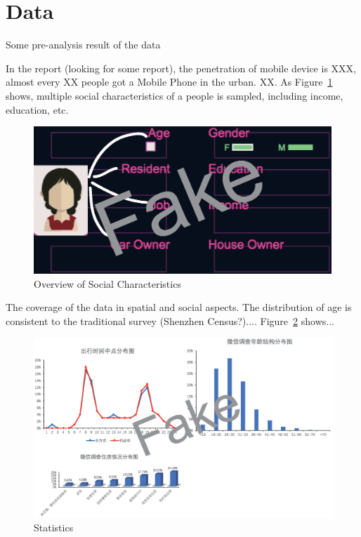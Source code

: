 \section{Data}

Some pre-analysis result of the data


In the report (looking for some report), the penetration of mobile device is XXX, almost every XX people got a Mobile Phone in the urban. XX. As Figure~\ref{fig:data_over} shows, multiple social characteristics of a people is sampled, including income, education, etc. 

\begin{figure}[htb!]
 \centering %
 \includegraphics[width=\columnwidth]{pictures/data_over1}
 \caption{Overview of Social Characteristics}
 \label{fig:data_over}
\end{figure}

The coverage of the data in spatial and social aspects. The distribution of age is consistent to the traditional survey (Shenzhen Census?).... Figure~\ref{fig:data_stat} shows...


\begin{figure}[htb!]
 \centering %
 \includegraphics[width=\columnwidth]{pictures/data_detail}
 \caption{Statistics}
 \label{fig:data_stat}
\end{figure}